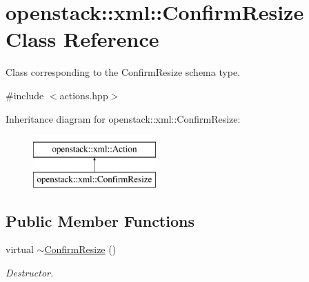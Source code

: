 \hypertarget{classopenstack_1_1xml_1_1ConfirmResize}{
\section{openstack::xml::ConfirmResize Class Reference}
\label{classopenstack_1_1xml_1_1ConfirmResize}
}


Class corresponding to the ConfirmResize schema type.  




{\ttfamily \#include $<$actions.hpp$>$}

Inheritance diagram for openstack::xml::ConfirmResize:\begin{figure}[H]
\begin{center}
\leavevmode
\includegraphics[height=2.000000cm]{classopenstack_1_1xml_1_1ConfirmResize}
\end{center}
\end{figure}
\subsection*{Public Member Functions}
\begin{DoxyCompactItemize}
\item 
\hypertarget{classopenstack_1_1xml_1_1ConfirmResize_acee7afb5b053a763250f5114909bd875}{
virtual \hyperlink{classopenstack_1_1xml_1_1ConfirmResize_acee7afb5b053a763250f5114909bd875}{$\sim$ConfirmResize} ()}
\label{classopenstack_1_1xml_1_1ConfirmResize_acee7afb5b053a763250f5114909bd875}

\begin{DoxyCompactList}\small\item\em Destructor. \item\end{DoxyCompactList}\end{DoxyCompactItemize}
